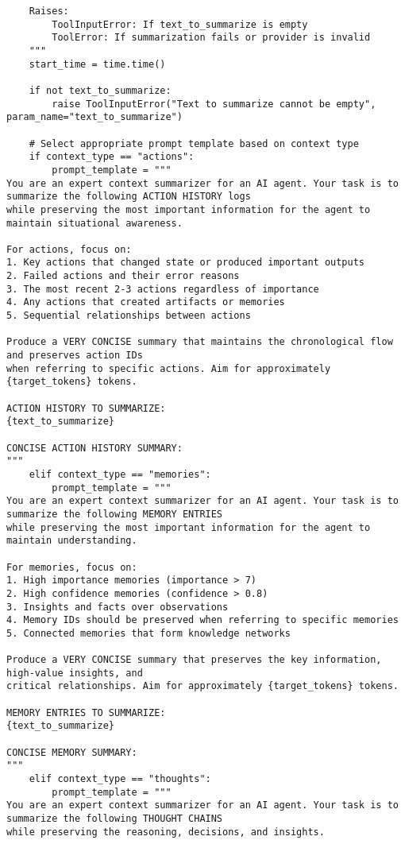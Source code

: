 \documentclass[12pt,a4paper]{article}
\begin{document}
\begin{pageablecode}
\begin{verbatim}
    Raises:
        ToolInputError: If text_to_summarize is empty
        ToolError: If summarization fails or provider is invalid
    """
    start_time = time.time()

    if not text_to_summarize:
        raise ToolInputError("Text to summarize cannot be empty", param_name="text_to_summarize")

    # Select appropriate prompt template based on context type
    if context_type == "actions":
        prompt_template = """
You are an expert context summarizer for an AI agent. Your task is to summarize the following ACTION HISTORY logs
while preserving the most important information for the agent to maintain situational awareness.

For actions, focus on:
1. Key actions that changed state or produced important outputs
2. Failed actions and their error reasons
3. The most recent 2-3 actions regardless of importance
4. Any actions that created artifacts or memories
5. Sequential relationships between actions

Produce a VERY CONCISE summary that maintains the chronological flow and preserves action IDs
when referring to specific actions. Aim for approximately {target_tokens} tokens.

ACTION HISTORY TO SUMMARIZE:
{text_to_summarize}

CONCISE ACTION HISTORY SUMMARY:
"""
    elif context_type == "memories":
        prompt_template = """
You are an expert context summarizer for an AI agent. Your task is to summarize the following MEMORY ENTRIES
while preserving the most important information for the agent to maintain understanding.

For memories, focus on:
1. High importance memories (importance > 7)
2. High confidence memories (confidence > 0.8)
3. Insights and facts over observations
4. Memory IDs should be preserved when referring to specific memories
5. Connected memories that form knowledge networks

Produce a VERY CONCISE summary that preserves the key information, high-value insights, and
critical relationships. Aim for approximately {target_tokens} tokens.

MEMORY ENTRIES TO SUMMARIZE:
{text_to_summarize}

CONCISE MEMORY SUMMARY:
"""
    elif context_type == "thoughts":
        prompt_template = """
You are an expert context summarizer for an AI agent. Your task is to summarize the following THOUGHT CHAINS
while preserving the reasoning, decisions, and insights.


\end{verbatim}
\end{pageablecode}
\end{document}

